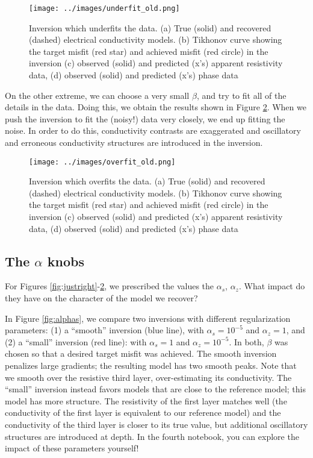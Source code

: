 \documentclass[11pt,oneside]{article}
\begin{document}
\begin{figure}[htb!]
    \centering
    \texttt{[image: ../images/underfit\_old.png]}
\caption{Inversion which underfits the data. (a) True (solid) and recovered (dashed) electrical conductivity models. (b) Tikhonov curve showing the target misfit (red star) and achieved misfit (red circle) in the inversion (c) observed (solid) and predicted (x’s) apparent resistivity data, (d) observed (solid) and predicted (x’s) phase data}
\label{fig:underfit}
\end{figure}

On the other extreme, we can choose a very small $\beta$, and try to fit all of the details in the data. Doing this, we obtain the results shown in Figure \ref{fig:overfit}. When we push the inversion to fit the (noisy!) data very closely, we end up fitting the noise. In order to do this, conductivity contrasts are exaggerated and oscillatory and erroneous conductivity structures are introduced in the inversion.



\begin{figure}[htb!]
    \centering
    \texttt{[image: ../images/overfit\_old.png]}
\caption{Inversion which overfits the data. (a) True (solid) and recovered (dashed) electrical conductivity models. (b) Tikhonov curve showing the target misfit (red star) and achieved misfit (red circle) in the inversion (c) observed (solid) and predicted (x’s) apparent resistivity data, (d) observed (solid) and predicted (x’s) phase data}
\label{fig:overfit}
\end{figure}
\subsection{The $\alpha$ knobs}

For Figures \ref{fig:justright}-\ref{fig:overfit}, we prescribed the values the $\alpha_s$, $\alpha_z$. What impact do they have on the character of the model we recover?

In Figure \ref{fig:alphas}, we compare two inversions with different regularization parameters: (1) a ``smooth'' inversion (blue line), with $\alpha_s = 10^{-5}$ and $\alpha_z = 1$, and (2) a ``small'' inversion (red line): with $\alpha_s = 1$ and $\alpha_z = 10^{-5}$. In both, $\beta$ was chosen so that a desired target misfit was achieved. The smooth inversion penalizes large gradients; the resulting model has two smooth peaks. Note that we smooth over the resistive third layer, over-estimating its conductivity. The ``small'' inversion instead favors models that are close to the reference model; this model has more structure. The resistivity of the first layer matches well (the conductivity of the first layer is equivalent to our reference model) and the conductivity of the third layer is closer to its true value, but additional oscillatory structures are introduced at depth. In the fourth notebook, you can explore the impact of these parameters yourself!
\end{document}
